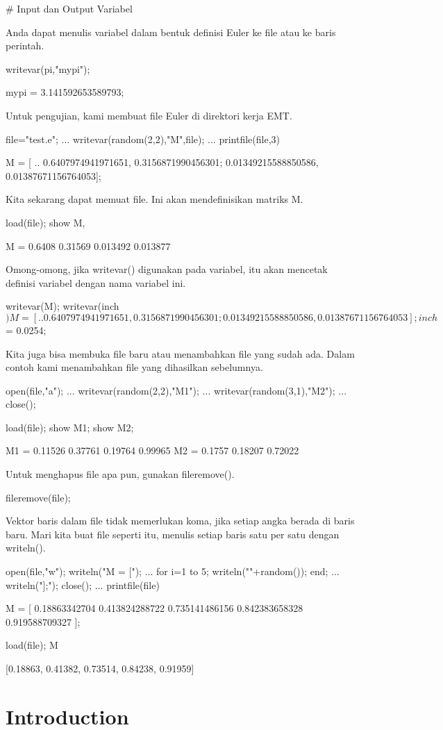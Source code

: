 \documentclass{article}
\begin{document}
# Input dan Output Variabel

Anda dapat menulis variabel dalam bentuk definisi Euler ke file atau
ke baris perintah.


\>writevar(pi,"mypi");


    mypi = 3.141592653589793;

Untuk pengujian, kami membuat file Euler di direktori kerja EMT.


\>file="test.e"; ...  
\>   writevar(random(2,2),"M",file); ...  
\>   printfile(file,3)


    M = [ ..
    0.6407974941971651, 0.3156871990456301;
    0.01349215588850586, 0.01387671156764053];

Kita sekarang dapat memuat file. Ini akan mendefinisikan matriks M.


\>load(file); show M,


    M = 
       0.6408   0.31569 
     0.013492  0.013877 

Omong-omong, jika writevar() digunakan pada variabel, itu akan
mencetak definisi variabel dengan nama variabel ini.


\>writevar(M); writevar(inch$)


    M = [ ..
    0.6407974941971651, 0.3156871990456301;
    0.01349215588850586, 0.01387671156764053];
    inch$ = 0.0254;

Kita juga bisa membuka file baru atau menambahkan file yang sudah ada.
Dalam contoh kami menambahkan file yang dihasilkan sebelumnya.


\>open(file,"a"); ...  
\>   writevar(random(2,2),"M1"); ...  
\>   writevar(random(3,1),"M2"); ...  
\>   close();

\>load(file); show M1; show M2;


    M1 = 
      0.11526   0.37761 
      0.19764   0.99965 
    M2 = 
       0.1757 
      0.18207 
      0.72022 

Untuk menghapus file apa pun, gunakan fileremove().


\>fileremove(file);


Vektor baris dalam file tidak memerlukan koma, jika setiap angka
berada di baris baru. Mari kita buat file seperti itu, menulis setiap
baris satu per satu dengan writeln().


\>open(file,"w"); writeln("M = ["); ...  
\>   for i=1 to 5; writeln(""+random()); end; ...  
\>   writeln("];"); close(); ...  
\>   printfile(file)


    M = [
    0.18863342704
    0.413824288722
    0.735141486156
    0.842383658328
    0.919588709327
    ];

\>load(file); M


    [0.18863,  0.41382,  0.73514,  0.84238,  0.91959]


\maketitle

\section{Introduction}
\end{document}
